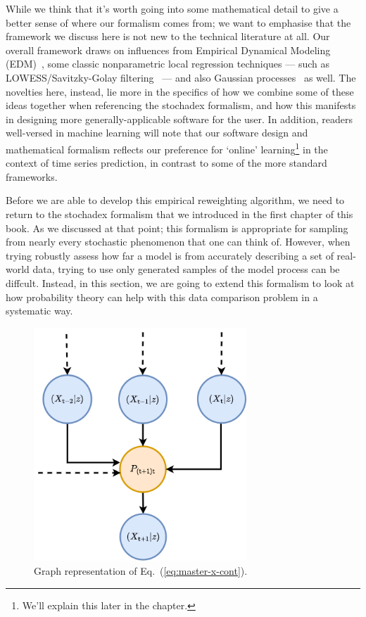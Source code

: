 While we think that it's worth going into some mathematical detail to give a better sense of where our formalism comes from; we want to emphasise that the framework we discuss here is not new to the technical literature at all. Our overall framework draws on influences from Empirical Dynamical Modeling (EDM)~\cite{sugihara1990nonlinear}, some classic nonparametric local regression techniques --- such as LOWESS/Savitzky-Golay filtering~\cite{savitzky1964smoothing} --- and also Gaussian processes~\cite{murphy2012machine} as well. The novelties here, instead, lie more in the specifics of how we combine some of these ideas together when referencing the stochadex formalism, and how this manifests in designing more generally-applicable software for the user. In addition, readers well-versed in machine learning will note that our software design and mathematical formalism reflects our preference for `online' learning\footnote{We'll explain this later in the chapter.} in the context of time series prediction, in contrast to some of the more standard frameworks.

Before we are able to develop this empirical reweighting algorithm, we need to return to the stochadex formalism that we introduced in the first chapter of this book. As we discussed at that point; this formalism is appropriate for sampling from nearly every stochastic phenomenon that one can think of. However, when trying robustly assess how far a model is from accurately describing a set of real-world data, trying to use only generated samples of the model process can be diffcult. Instead, in this section, we are going to extend this formalism to look at how probability theory can help with this data comparison problem in a systematic way.

\begin{figure}[h]
\centering
\includegraphics[width=8cm]{images/chapter-4-master-eq-graph.drawio.png}
\caption{Graph representation of Eq.~(\ref{eq:master-x-cont}).}
\label{fig:master-eqn}
\end{figure} 

